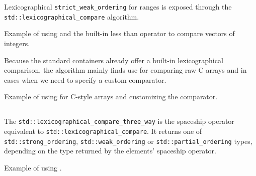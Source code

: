 Lexicographical \texttt{strict\_weak\_ordering} for ranges is exposed through the \texttt{std::lexicographical\_compare} algorithm.



\begin{box-note}
\footnotesize Example of using  and the built-in less than operator to compare vectors of integers.
\tcblower
{}
\end{box-note}

Because the standard containers already offer a built-in lexicographical comparison, the algorithm mainly finds use for comparing raw C arrays and in cases when we need to specify a custom comparator.

\begin{box-note}
\footnotesize Example of using  for C-style arrays and customizing the comparator.
\tcblower
{}
\end{box-note}

\subsection{\texorpdfstring{}{\texttt{std::lexicographical\_compare\_three\_way}}}

The \texttt{std::lexicographical\_compare\_three\_way} is the spaceship operator equivalent to \texttt{std::lexicographical\_compare}. It returns one of \texttt{std::strong\_ordering}, \texttt{std::weak\_ordering} or \texttt{std::partial\_ordering} types, depending on the type returned by the elements' spaceship operator.


\begin{box-note}
\footnotesize Example of using .
\tcblower
{}
\end{box-note}

